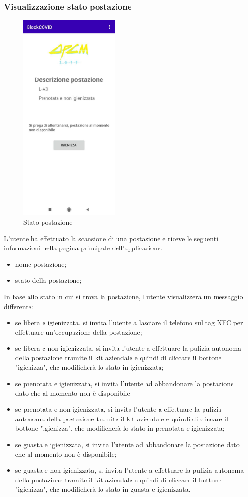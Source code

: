 	\subsubsection{Visualizzazione stato postazione}
	\begin{figure}[H]
		\centering
		\includegraphics[width=5cm]{res/images/prenotataENonIgienizzata.png}
		\caption{Stato postazione}
	\end{figure}
	L'utente ha effettuato la scansione di una postazione e riceve le seguenti informazioni nella pagina principale dell'applicazione:
	\begin{itemize}
		\item nome postazione;
		\item stato della postazione;
	\end{itemize}
	In base allo stato in cui si trova la postazione, l'utente visualizzerà un messaggio differente:
	\begin{itemize}
		\item se libera e igienizzata, si invita l'utente a lasciare il telefono sul tag NFC per effettuare un'occupazione della postazione;
		\item se libera e non igienizzata, si invita l'utente a effettuare la pulizia autonoma della postazione tramite il kit aziendale e quindi di cliccare il bottone "igienizza", che modificherà lo stato in igienizzata;
		\item se prenotata e igienizzata, si invita l'utente ad abbandonare la postazione dato che al momento non è disponibile;
		\item se prenotata e non igienizzata, si invita l'utente a effettuare la pulizia autonoma della postazione tramite il kit aziendale e quindi di cliccare il bottone "igienizza", che modificherà lo stato in prenotata e igienizzata;
		\item se guasta e igienizzata, si invita l'utente ad abbandonare la postazione dato che al momento non è disponibile;
		\item se guasta e non igienizzata, si invita l'utente a effettuare la pulizia autonoma della postazione tramite il kit aziendale e quindi di cliccare il bottone "igienizza", che modificherà lo stato in guasta e igienizzata.
	\end{itemize}
	
